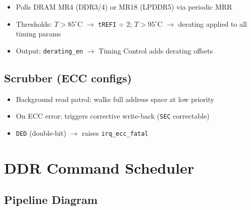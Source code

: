 \documentclass[11pt,a4paper]{article}
\begin{document}
\begin{itemize}
  \item Polls DRAM MR4 (DDR3/4) or MR18 (LPDDR5) via periodic MRR
  \item Thresholds: $T > 85^{\circ}$C $\rightarrow$ \texttt{tREFI} $\div$ 2;
        $T > 95^{\circ}$C $\rightarrow$ derating applied to all timing params
  \item Output: \texttt{derating\_en} $\rightarrow$ Timing Control adds
        derating offsets
\end{itemize}

\subsection{Scrubber (ECC configs)}

\begin{itemize}
  \item Background read patrol: walks full address space at low priority
  \item On ECC error: triggers corrective write-back (\texttt{SEC} correctable)
  \item \texttt{DED} (double-bit) $\rightarrow$ raises \texttt{irq\_ecc\_fatal}
\end{itemize}

\section{DDR Command Scheduler}

\subsection*{Pipeline Diagram}
\end{document}
